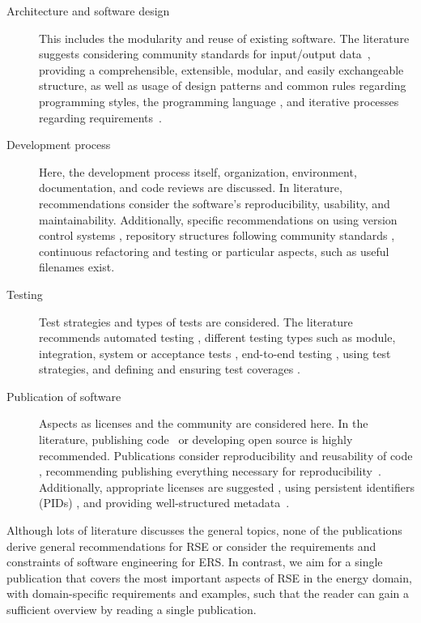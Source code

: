 \begin{description}
\item[Architecture and software design] This includes the modularity and reuse of existing software. The literature suggests considering community standards for input/output data~\cite{castell2024towards}, providing a comprehensible, extensible, modular, and easily exchangeable structure, as well as usage of design patterns and common rules regarding programming styles, the programming language \cite{drlsoftwareinitiative}, and iterative processes regarding requirements~\cite{johanson2018software}.
\item[Development process] Here, the development process itself, organization, environment, documentation, and code reviews are discussed. In literature, recommendations consider the software's reproducibility, usability, and maintainability. Additionally, specific recommendations on using version control systems \cite{castell2024towards}, repository structures following community standards \cite{castell2024towards},  continuous refactoring and testing \cite{drlsoftwareinitiative} or particular aspects, such as useful filenames \cite{trisovic2022large} exist.
\item[Testing] Test strategies and types of tests are considered. The literature recommends automated testing \cite{castell2024towards, drlsoftwareinitiative}, different testing types such as module, integration, system or acceptance tests \cite{drlsoftwareinitiative}, end-to-end testing \cite{hunter2021ten}, using test strategies, and defining and ensuring test coverages \cite{drlsoftwareinitiative}. 
\item[Publication of software] Aspects as licenses and the community are considered here. In the literature, publishing code~\cite{barnes2010publish} or developing open source \cite{hasselbring2020open} is highly recommended. Publications consider reproducibility and reusability of code \cite{gruenpeter2020m2}, recommending publishing everything necessary for reproducibility~\cite{stodden2016enhancing}. Additionally, appropriate licenses are suggested \cite{castell2024towards}, using persistent identifiers (PIDs) \cite{castell2024towards}, and providing well-structured metadata~\cite{castell2024towards}.
\end{description}

Although lots of literature discusses the general topics, none of the publications derive general recommendations for \ac{RSE} or 
consider the requirements and constraints of software engineering for \ac{ERS}. 
In contrast, we aim for a single publication that covers the most important aspects of \ac{RSE} in the energy domain, with domain-specific requirements and examples, such that the reader can gain a sufficient overview by reading a single publication.
